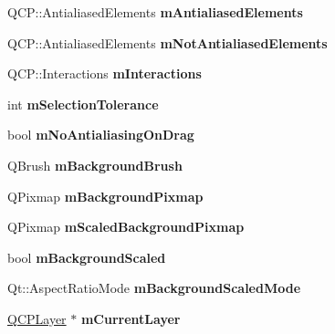 \begin{DoxyCompactItemize}
Q\+C\+P\+::\+Antialiased\+Elements {\bfseries m\+Antialiased\+Elements}
\item 
\mbox{\label{class_q_custom_plot_a2b6ebcad00a90ba07f146cefcd4293da}} 
Q\+C\+P\+::\+Antialiased\+Elements {\bfseries m\+Not\+Antialiased\+Elements}
\item 
\mbox{\label{class_q_custom_plot_ad717377ceba7493b4b32f0bcbbdf1895}} 
Q\+C\+P\+::\+Interactions {\bfseries m\+Interactions}
\item 
\mbox{\label{class_q_custom_plot_abc36e12dd0482117ad810a800c847722}} 
int {\bfseries m\+Selection\+Tolerance}
\item 
\mbox{\label{class_q_custom_plot_ac83df968435f6b8ec79f2993ab9124e8}} 
bool {\bfseries m\+No\+Antialiasing\+On\+Drag}
\item 
\mbox{\label{class_q_custom_plot_a3aef5de4ac012178e3293248e9c63737}} 
Q\+Brush {\bfseries m\+Background\+Brush}
\item 
\mbox{\label{class_q_custom_plot_ae8f4677399324a78c5f8dbfb95a34f90}} 
Q\+Pixmap {\bfseries m\+Background\+Pixmap}
\item 
\mbox{\label{class_q_custom_plot_a081bf046501d52642dc6d7e3bdb97d57}} 
Q\+Pixmap {\bfseries m\+Scaled\+Background\+Pixmap}
\item 
\mbox{\label{class_q_custom_plot_a62fe584b20680b1b2e1c7efb5c5416a5}} 
bool {\bfseries m\+Background\+Scaled}
\item 
\mbox{\label{class_q_custom_plot_ab82e8a5e3ad6b486f95d6da8bf49e9aa}} 
Qt\+::\+Aspect\+Ratio\+Mode {\bfseries m\+Background\+Scaled\+Mode}
\item 
\mbox{\label{class_q_custom_plot_a3d648a5cdc87a1a59288e526c5bc3c7a}} 
\hyperlink{class_q_c_p_layer}{Q\+C\+P\+Layer} $\ast$ {\bfseries m\+Current\+Layer}
\item 
\mbox{\label{class_q_custom_plot_aa184197a6101a9cc5807469e1d006c9e}} 

\end{DoxyCompactItemize}
